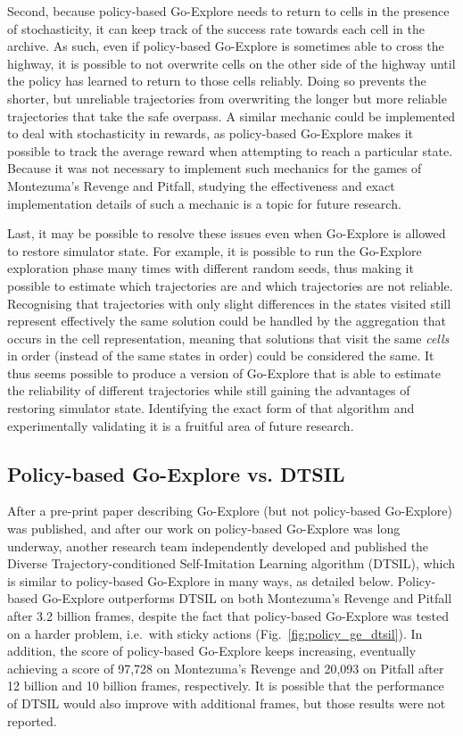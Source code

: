 \documentclass{nature}
\renewcommand*{\cite}[1]{\supercite{#1}}
\begin{document}
Second, because policy-based Go-Explore needs to return to cells in the presence of stochasticity, it can keep track of the success rate towards each cell in the archive. 
As such, even if policy-based Go-Explore is sometimes able to cross the highway, it is possible to not overwrite cells on the other side of the highway until the policy has learned to return to those cells reliably.
Doing so prevents the shorter, but unreliable trajectories from overwriting the longer but more reliable trajectories that take the safe overpass.
A similar mechanic could be implemented to deal with stochasticity in rewards, as policy-based Go-Explore makes it possible to track the average reward when attempting to reach a particular state.
Because it was not necessary to implement such mechanics for the games of Montezuma's Revenge and Pitfall, studying the effectiveness and exact implementation details of such a mechanic is a topic for future research.



Last, it may be possible to resolve these issues even when Go-Explore is allowed to restore simulator state. 
For example, it is possible to run the Go-Explore exploration phase many times with different random seeds, thus making it possible to estimate which trajectories are and which trajectories are not reliable. Recognising that trajectories with only slight differences in the states visited still represent effectively the same solution could be handled by the aggregation that occurs in the cell representation, meaning that solutions that visit the same \emph{cells} in order (instead of the same states in order) could be considered the same.
It thus seems possible to produce a version of Go-Explore that is able to estimate the reliability of different trajectories while still gaining the advantages of restoring simulator state. Identifying the exact form of that algorithm and experimentally validating it is a fruitful area of future research.

\subsection{Policy-based Go-Explore vs. DTSIL}

After a pre-print paper describing Go-Explore\cite{ecoffet2019go} (but not policy-based Go-Explore) was published, and after our work on policy-based Go-Explore was long underway, another research team independently developed and published the Diverse Trajectory-conditioned Self-Imitation Learning algorithm (DTSIL)\cite{guo2019efficient}, which is similar to policy-based Go-Explore in many ways, as detailed below. Policy-based Go-Explore outperforms DTSIL on both Montezuma's Revenge and Pitfall after 3.2 billion frames, despite the fact that policy-based Go-Explore was tested on a harder problem, i.e.\ with sticky actions (Fig.~\ref{fig:policy_ge_dtsil}).
In addition, the score of policy-based Go-Explore keeps increasing, eventually achieving a score of 97,728 on Montezuma's Revenge and 20,093 on Pitfall after 12 billion and 10 billion frames, respectively.
It is possible that the performance of DTSIL would also improve with additional frames, but those results were not reported.
\end{document}
